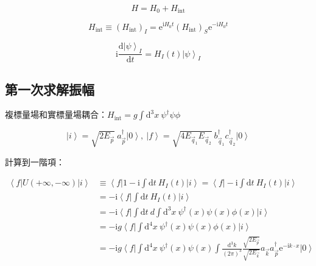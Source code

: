 \documentclass{article}
\begin{document}
$$
  H=H_0+H_{\mathrm{int}}
$$

$$
  H_{\mathrm{int}}\equiv(H_{\mathrm{int}})_I=\mathrm{e}^{\mathrm{i}H_0t}(H_{\mathrm{int}})_S\mathrm{e}^{-\mathrm{i}H_0t}
$$

$$
  \mathrm{i}\frac{\mathrm{d}\left|\psi\right\rangle_I}{\mathrm{d}t}=H_I(t)\left|\psi\right\rangle_I
$$

\subsection{第一次求解振幅}

複標量場和實標量場耦合：$H_{\mathrm{int}}=g\int\mathrm{d}^3x\ \psi^{\dagger}\psi\phi$

$$
  \left|i\right\rangle=\sqrt{2E_{\vec{p}}}\ a_{\vec{p}}^{\dagger}\left|0\right\rangle,\ \left|f\right\rangle=\sqrt{4E_{\vec{q}_1}E_{\vec{q}_2}}\ b_{\vec{q}_1}^{\dagger}c_{\vec{q}_2}^{\dagger}\left|0\right\rangle
$$

計算到一階項：

$$
  \begin{aligned}
    \left\langle f\right|U(+\infty,-\infty)\left|i\right\rangle & \equiv\left\langle f\right|1-\mathrm{i}\int\mathrm{d}t\ H_I(t)\left|i\right\rangle=\left\langle f\right|-\mathrm{i}\int\mathrm{d}t\ H_I(t)\left|i\right\rangle                                                                                     \\
                                                                & =-\mathrm{i}\left\langle f\right|\int\mathrm{d}t\ H_I(t)\left|i\right\rangle                                                                                                                                                                       \\
                                                                & =-\mathrm{i}\left\langle f\right|\int\mathrm{d}t\ d\int\mathrm{d}^3x\ \psi^{\dagger}(x)\psi(x)\phi(x)\left|i\right\rangle                                                                                                                          \\
                                                                & =-\mathrm{i}g\left\langle f\right|\int\mathrm{d}^4x\ \psi^{\dagger}(x)\psi(x)\phi(x)\left|i\right\rangle                                                                                                                                           \\
                                                                & =-\mathrm{i}g\left\langle f\right|\int\mathrm{d}^4x\ \psi^{\dagger}(x)\psi(x)\int\frac{\mathrm{d}^3k}{(2\pi)^3}\frac{\sqrt{2E_{\vec{p}}}}{\sqrt{2E_{\vec{k}}}}a_{\vec{k}}a_{\vec{p}}^{\dagger}\mathrm{e}^{-\mathrm{i}k\cdot x}\left|0\right\rangle \\
  \end{aligned}
$$
\end{document}
